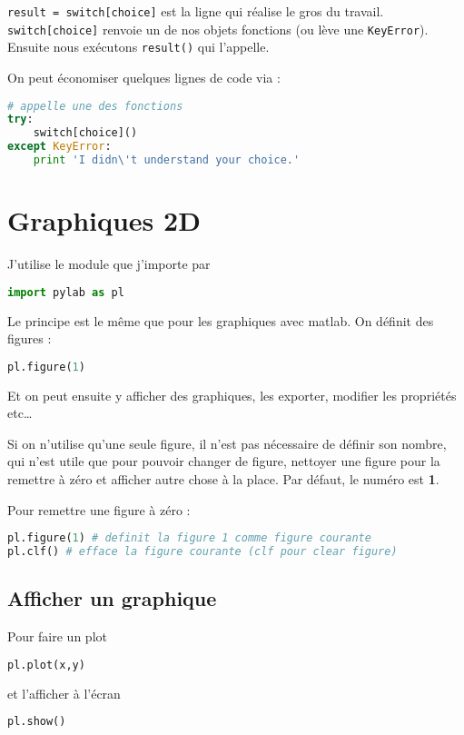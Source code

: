\documentclass[a4paper,twoside]{article}
\begin{document}
\verb|result = switch[choice]| est la ligne qui réalise le gros du travail. \verb|switch[choice]| renvoie un de nos objets fonctions (ou lève une \verb|KeyError|). Ensuite nous exécutons \verb|result()| qui l’appelle.

On peut économiser quelques lignes de code via :
\begin{lstlisting}[language=python]
# appelle une des fonctions
try:
    switch[choice]()
except KeyError:
    print 'I didn\'t understand your choice.'
\end{lstlisting}



\section{Graphiques 2D}
J'utilise le module  que j'importe par
\begin{lstlisting}[language=python]
import pylab as pl
\end{lstlisting}

Le principe est le même que pour les graphiques avec matlab. On définit des figures :
\begin{lstlisting}[language=python]
pl.figure(1)
\end{lstlisting}
Et on peut ensuite y afficher des graphiques, les exporter, modifier les propriétés etc\dots

\begin{remarque}
Si on n'utilise qu'une seule figure, il n'est pas nécessaire de définir son nombre, qui n'est utile que pour pouvoir changer de figure, nettoyer une figure pour la remettre à zéro et afficher autre chose à la place. Par défaut, le numéro est \textbf{1}.
\end{remarque}

Pour remettre une figure à zéro :
\begin{lstlisting}[language=python]
pl.figure(1) # definit la figure 1 comme figure courante
pl.clf() # efface la figure courante (clf pour clear figure)
\end{lstlisting}

\subsection{Afficher un graphique}
Pour faire un plot
\begin{lstlisting}[language=python]
pl.plot(x,y)
\end{lstlisting}
et l'afficher à l'écran
\begin{lstlisting}[language=python]
pl.show()
\end{lstlisting}
\end{document}
